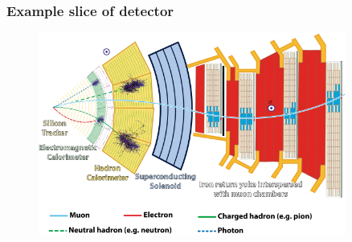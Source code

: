 \begin{frame}
\frametitle{Example slice of detector}

\begin{figure}[htbp]
\begin{center}
\includegraphics[width=0.9\textwidth]{images/CMSslice_whiteBackground.png}
\end{center}
\end{figure}


\end{frame}


